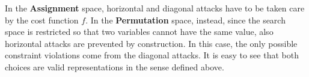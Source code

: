 \begin{figure}
  \subfigures 
  \begin{minipage}{\textwidth}
    \hspace{\fill}
  \end{minipage}
\end{figure}

In the \textbf{Assignment} space, horizontal and diagonal attacks have
to be taken care by the cost function $f$. In the \textbf{Permutation}
space, instead, since the search space is restricted so that two variables
cannot have the same value, also horizontal attacks are prevented by construction. In
this case, the only possible constraint violations come from the
diagonal attacks. It is easy to see that both choices are valid representations in the
sense defined above.


